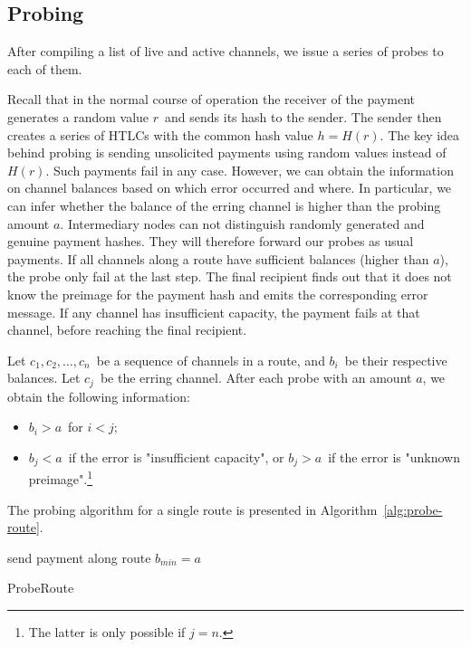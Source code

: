 \subsection{Probing}

After compiling a list of live and active channels, we issue a series of probes to each of them.

Recall that in the normal course of operation the receiver of the payment generates a random value $r$~and sends its hash to the sender.
The sender then creates a series of HTLCs with the common hash value $h = H(r)$.
The key idea behind probing is sending unsolicited payments using random values instead of $H(r)$.
Such payments fail in any case.
However, we can obtain the information on channel balances based on which error occurred and where.
In particular, we can infer whether the balance of the erring channel is higher than the probing amount $a$.
Intermediary nodes can not distinguish randomly generated and genuine payment hashes.
They will therefore forward our probes as usual payments.
If all channels along a route have sufficient balances (higher than $a$), the probe only fail at the last step.
The final recipient finds out that it does not know the preimage for the payment hash and emits the corresponding error message.
If any channel has insufficient capacity, the payment fails at that channel, before reaching the final recipient.

Let $c_1, c_2, \dots, c_n$~be a sequence of channels in a route, and $b_i$~be their respective balances.
Let $c_j$~be the erring channel.
After each probe with an amount $a$, we obtain the following information:
\begin{itemize}
	\item $b_i > a$~for $i<j$;
	\item $b_j < a$~if the error is "insufficient capacity", or $b_j > a$~if the error is "unknown preimage".\footnote{The latter is only possible if $j=n$.}
\end{itemize}

The probing algorithm for a single route is presented in Algorithm~\ref{alg:probe-route}.

\begin{algorithm}
	send payment along route\;
	 {
		$b_{min} = a$\;
	}
	\caption{ProbeRoute}
	\label{alg:probe-route}
\end{algorithm}


